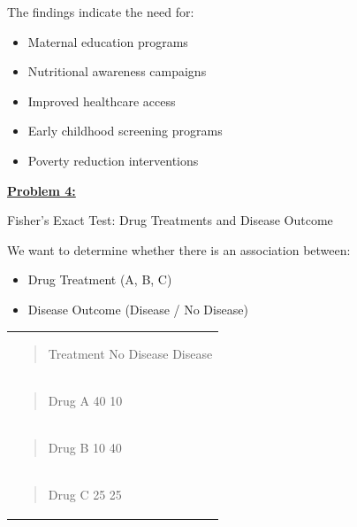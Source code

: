 \documentclass[
]{article}
\newcounter{none} %
\begin{document}
The findings indicate the need for:

\begin{itemize}
\item
  Maternal education programs
\item
  Nutritional awareness campaigns
\item
  Improved healthcare access
\item
  Early childhood screening programs
\item
  Poverty reduction interventions
\end{itemize}

\textbf{\ul{Problem 4:}}

Fisher's Exact Test: Drug Treatments and Disease Outcome

We want to determine whether there is an association between:

\begin{itemize}
\item
  Drug Treatment (A, B, C)
\item
  Disease Outcome (Disease / No Disease)
\end{itemize}

{\def\LTcaptype{none} %
\begin{longtable}[]{@{}
  >{\raggedright\arraybackslash}p{}@{}}
\toprule\noalign{}
\endhead
\bottomrule\noalign{}
\endlastfoot
\begin{minipage}[t]{\linewidth}\raggedright
\begin{quote}
Treatment No Disease Disease
\end{quote}
\end{minipage} \\
\begin{minipage}[t]{\linewidth}\raggedright
\begin{quote}
Drug A 40 10
\end{quote}
\end{minipage} \\
\begin{minipage}[t]{\linewidth}\raggedright
\begin{quote}
Drug B 10 40
\end{quote}
\end{minipage} \\
\begin{minipage}[t]{\linewidth}\raggedright
\begin{quote}
Drug C 25 25
\end{quote}
\end{minipage} \\
\end{longtable}
}
\end{document}

